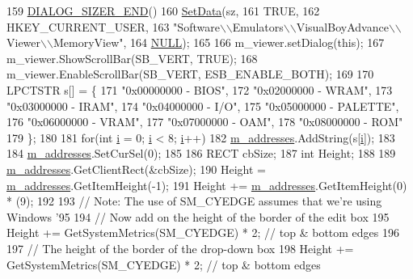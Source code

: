 \begin{DoxyCode}
159     \mbox{\hyperlink{_resize_dlg_8h_aeac0c1e32f30e0763df5736e4b3ea50a}{DIALOG\_SIZER\_END}}()
160     \mbox{\hyperlink{class_resize_dlg_a6a3965f44a0c2f5ba9aaa798a9a81df5}{SetData}}(sz,
161             TRUE,
162             HKEY\_CURRENT\_USER,
163             "Software\(\backslash\)\(\backslash\)Emulators\(\backslash\)\(\backslash\)VisualBoyAdvance\(\backslash\)\(\backslash\)Viewer\(\backslash\)\(\backslash\)MemoryView",
164             \mbox{\hyperlink{getopt1_8c_a070d2ce7b6bb7e5c05602aa8c308d0c4}{NULL}});
165   
166   m\_viewer.setDialog(this);
167   m\_viewer.ShowScrollBar(SB\_VERT, TRUE);
168   m\_viewer.EnableScrollBar(SB\_VERT, ESB\_ENABLE\_BOTH);
169 
170   LPCTSTR s[] = \{
171     \textcolor{stringliteral}{"0x00000000 - BIOS"},
172     \textcolor{stringliteral}{"0x02000000 - WRAM"},
173     \textcolor{stringliteral}{"0x03000000 - IRAM"},
174     \textcolor{stringliteral}{"0x04000000 - I/O"},
175     \textcolor{stringliteral}{"0x05000000 - PALETTE"},
176     \textcolor{stringliteral}{"0x06000000 - VRAM"},
177     \textcolor{stringliteral}{"0x07000000 - OAM"},
178     \textcolor{stringliteral}{"0x08000000 - ROM"}
179   \};
180 
181   \textcolor{keywordflow}{for}(\textcolor{keywordtype}{int} \mbox{\hyperlink{expr-lex_8cpp_acb559820d9ca11295b4500f179ef6392}{i}} = 0; \mbox{\hyperlink{expr-lex_8cpp_acb559820d9ca11295b4500f179ef6392}{i}} < 8; \mbox{\hyperlink{expr-lex_8cpp_acb559820d9ca11295b4500f179ef6392}{i}}++)
182     \mbox{\hyperlink{class_memory_viewer_dlg_ac61656d575927b23941090002e5ce996}{m\_addresses}}.AddString(s[\mbox{\hyperlink{expr-lex_8cpp_acb559820d9ca11295b4500f179ef6392}{i}}]);
183 
184   \mbox{\hyperlink{class_memory_viewer_dlg_ac61656d575927b23941090002e5ce996}{m\_addresses}}.SetCurSel(0);
185 
186   RECT cbSize;
187   \textcolor{keywordtype}{int} Height;
188   
189   \mbox{\hyperlink{class_memory_viewer_dlg_ac61656d575927b23941090002e5ce996}{m\_addresses}}.GetClientRect(&cbSize);
190   Height = \mbox{\hyperlink{class_memory_viewer_dlg_ac61656d575927b23941090002e5ce996}{m\_addresses}}.GetItemHeight(-1);
191   Height += \mbox{\hyperlink{class_memory_viewer_dlg_ac61656d575927b23941090002e5ce996}{m\_addresses}}.GetItemHeight(0) * (9);
192   
193   \textcolor{comment}{// Note: The use of SM\_CYEDGE assumes that we're using Windows '95}
194   \textcolor{comment}{// Now add on the height of the border of the edit box}
195   Height += GetSystemMetrics(SM\_CYEDGE) * 2;  \textcolor{comment}{// top & bottom edges}
196   
197   \textcolor{comment}{// The height of the border of the drop-down box}
198   Height += GetSystemMetrics(SM\_CYEDGE) * 2;  \textcolor{comment}{// top & bottom edges}

\end{DoxyCode}
